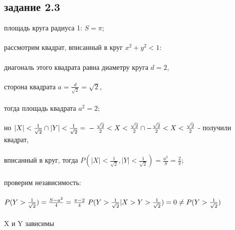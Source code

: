 \documentclass[a4paper]{article}
\begin{document}
\begin{large}
	\section*{задание 2.3}
	площадь круга радиуса 1: $S=\pi$;\\\\
	рассмотрим квадрат, вписанный в круг $x^2+y^2<1$:\\\\
	диагональ этого квадрата равна диаметру круга $d=2$,\\\\
	сторона квадрата $a=\frac{d}{\sqrt{2}}=\sqrt{2}$,\\\\
	тогда площадь квадрата $a^2=2$;\\\\
	но $|X|<\frac{1}{\sqrt{2}}\cap |Y|<\frac{1}{\sqrt{2}}=\\\\
	-\frac{\sqrt{2}}{2}<X<\frac{\sqrt{2}}{2}\cap-\frac{\sqrt{2}}{2}<X<\frac{\sqrt{2}}{2}$ - получили квадрат,\\\\
	вписанный в круг, тогда $P(|X|<\frac{1}{\sqrt{2}},|Y|<\frac{1}{\sqrt{2}})=\frac{a^2}{S}=\frac{2}{\pi}$;\\\\
	проверим независимость:\\\\
	$
	P(Y>\frac{1}{\sqrt{2}})=\frac{S-a^2}{4}=\frac{\pi-2}{4}\\\
	P(Y>\frac{1}{\sqrt{2}}|X>Y>\frac{1}{\sqrt{2}})=0\ne P(Y>\frac{1}{\sqrt{2}})
	$\\\\
	X и Y зависимы

\end{large}
\end{document}

